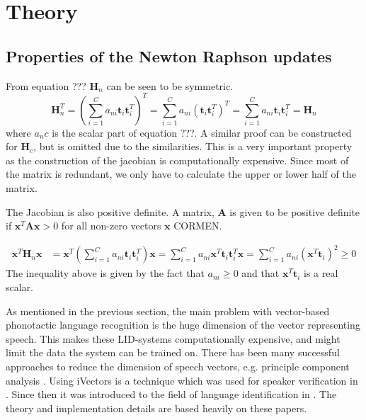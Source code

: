\chapter{Theory}
\label{sect:Theory}

\section{Properties of the Newton Raphson updates}

From equation ??? $\mathbf{H}_n$ can be seen to be symmetric.
\begin{equation}\label{symproof}
\mathbf{H}_n^T = \left(\sum_{i=1}^{C}a_{ni}\mathbf{t}_i\mathbf{t}_i^T\right)^T = \sum_{i=1}^{C}a_{ni}\left(\mathbf{t}_i\mathbf{t}_i^T\right)^T =
 \sum_{i=1}^{C}a_{ni}\mathbf{t}_i\mathbf{t}_i^T = \mathbf{H}_n
\end{equation}
where $a_nc$ is the scalar part of equation ???. A similar proof can be constructed for $\mathbf{H}_c$, but is omitted due to the similarities. This is a very important property as the construction of the jacobian is computationally expensive. Since most of the matrix is redundant, we only have to calculate the upper or lower half of the matrix. 

The Jacobian is also positive definite. A matrix, $\mathbf{A}$ is given to be positive definite if $\mathbf{x}^T\mathbf{Ax} > 0$ for all non-zero vectors $\mathbf{x}$ CORMEN. 

\begin{align}
\mathbf{x}^T\mathbf{H}_n\mathbf{x} &= \mathbf{x}^T\left(\sum_{i=1}^{C}a_{ni}\mathbf{t}_i\mathbf{t}_i^T\right)\mathbf{x} 
= \sum_{i=1}^{C}a_{ni}\mathbf{x}^T\mathbf{t}_i\mathbf{t}_i^T\mathbf{x} 
= \sum_{i=1}^{C}a_{ni}\left(\mathbf{x}^T\mathbf{t}_i\right)^2 \geq 0 
\end{align}
The inequality above is given by the fact that $a_{ni} \geq 0$ and that $\mathbf{x}^T\mathbf{t}_i$ is a real scalar.

\label{chapterfive}

As mentioned in the previous section, the main problem with vector-based phonotactic language recognition is the huge dimension of the vector representing speech. This makes these LID-systems computationally expensive, and might limit the data the system can be trained on. There has been many successful approaches to reduce the dimension of speech vectors, e.g. principle component analysis \cite{pcaLID}. Using iVectors is a technique which was used for speaker verification in \cite{sviVector}. Since then it was introduced to the field of language identification in \cite{liiVector}. The theory and implementation details are based heavily on these papers.

